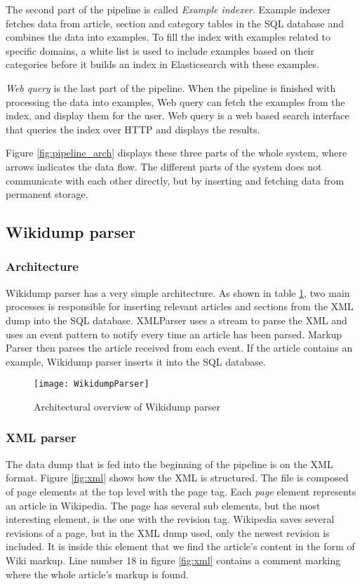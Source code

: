 The second part of the pipeline is called \textit{Example indexer}. Example indexer fetches data from article, section and category tables in the SQL database and combines the data into examples. To fill the index with examples related to specific domains, a white list is used to include examples based on their categories before it builds an index in Elasticsearch with these examples.

\textit{Web query} is the last part of the pipeline. When the pipeline is finished with processing the data into examples, Web query can fetch the examples from the index, and display them for the user. Web query is a web based search interface that queries the index over HTTP and displays the results.

Figure \ref{fig:pipeline_arch} displays these three parts of the whole system, where arrows indicates the data flow. The different parts of the system does not communicate with each other directly, but by inserting and fetching data from permanent storage. 


\subsection{Wikidump parser}

\subsubsection{Architecture}
Wikidump parser has a very simple architecture. As shown in table \ref{fig:wikidump_parser}, two main processes is responsible for inserting relevant articles and sections from the XML dump into the SQL database. XMLParser uses a stream to parse the XML and uses an event pattern to notify every time an article has been parsed. Markup Parser then parses the article received from each event. If the article contains an example, Wikidump parser inserts it into the SQL database.

\begin{figure}[h]
\caption{Architectural overview of Wikidump parser}
\texttt{[image: WikidumpParser]}
\label{fig:wikidump_parser}
\end{figure}

\subsubsection{XML parser}

The data dump that is fed into the beginning of the pipeline is on the XML format. Figure \ref{fig:xml} shows how the XML is structured. The file is composed of page elements at the top level with the page tag. Each \textit{page} element represents an article in Wikipedia. The page has several sub elements, but the most interesting element, is the one with the revision tag. Wikipedia saves several revisions of a page, but in the XML dump used, only the newest revision is included. It is inside this element that we find the article's content in the form of Wiki markup. Line number 18 in figure \ref{fig:xml} contains a comment marking where the whole article's markup is found.

